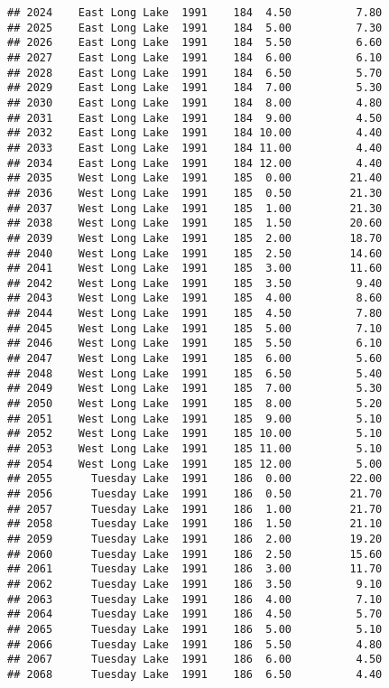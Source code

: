 \documentclass[
]{article}
\begin{document}
\begin{verbatim}
## 2024    East Long Lake  1991    184  4.50          7.80
## 2025    East Long Lake  1991    184  5.00          7.30
## 2026    East Long Lake  1991    184  5.50          6.60
## 2027    East Long Lake  1991    184  6.00          6.10
## 2028    East Long Lake  1991    184  6.50          5.70
## 2029    East Long Lake  1991    184  7.00          5.30
## 2030    East Long Lake  1991    184  8.00          4.80
## 2031    East Long Lake  1991    184  9.00          4.50
## 2032    East Long Lake  1991    184 10.00          4.40
## 2033    East Long Lake  1991    184 11.00          4.40
## 2034    East Long Lake  1991    184 12.00          4.40
## 2035    West Long Lake  1991    185  0.00         21.40
## 2036    West Long Lake  1991    185  0.50         21.30
## 2037    West Long Lake  1991    185  1.00         21.30
## 2038    West Long Lake  1991    185  1.50         20.60
## 2039    West Long Lake  1991    185  2.00         18.70
## 2040    West Long Lake  1991    185  2.50         14.60
## 2041    West Long Lake  1991    185  3.00         11.60
## 2042    West Long Lake  1991    185  3.50          9.40
## 2043    West Long Lake  1991    185  4.00          8.60
## 2044    West Long Lake  1991    185  4.50          7.80
## 2045    West Long Lake  1991    185  5.00          7.10
## 2046    West Long Lake  1991    185  5.50          6.10
## 2047    West Long Lake  1991    185  6.00          5.60
## 2048    West Long Lake  1991    185  6.50          5.40
## 2049    West Long Lake  1991    185  7.00          5.30
## 2050    West Long Lake  1991    185  8.00          5.20
## 2051    West Long Lake  1991    185  9.00          5.10
## 2052    West Long Lake  1991    185 10.00          5.10
## 2053    West Long Lake  1991    185 11.00          5.10
## 2054    West Long Lake  1991    185 12.00          5.00
## 2055      Tuesday Lake  1991    186  0.00         22.00
## 2056      Tuesday Lake  1991    186  0.50         21.70
## 2057      Tuesday Lake  1991    186  1.00         21.70
## 2058      Tuesday Lake  1991    186  1.50         21.10
## 2059      Tuesday Lake  1991    186  2.00         19.20
## 2060      Tuesday Lake  1991    186  2.50         15.60
## 2061      Tuesday Lake  1991    186  3.00         11.70
## 2062      Tuesday Lake  1991    186  3.50          9.10
## 2063      Tuesday Lake  1991    186  4.00          7.10
## 2064      Tuesday Lake  1991    186  4.50          5.70
## 2065      Tuesday Lake  1991    186  5.00          5.10
## 2066      Tuesday Lake  1991    186  5.50          4.80
## 2067      Tuesday Lake  1991    186  6.00          4.50
## 2068      Tuesday Lake  1991    186  6.50          4.40

\end{verbatim}
\end{document}
